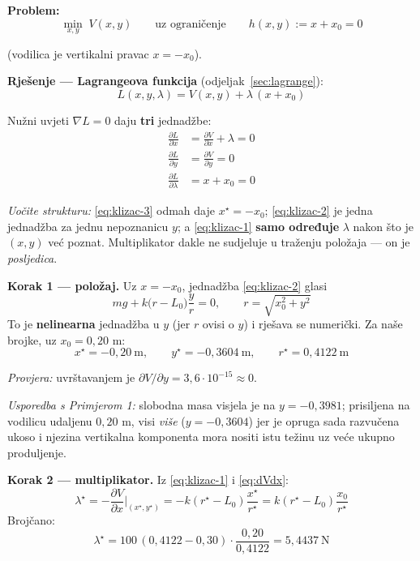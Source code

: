 \textbf{Problem:}
\begin{equation}
\label{eq:klizac}
\min_{x,y}\; V(x,y) \qquad\text{uz ograničenje}\qquad h(x,y) := x + x_0 = 0
\end{equation}

(vodilica je vertikalni pravac $x = -x_0$).

\textbf{Rješenje --- Lagrangeova funkcija} (odjeljak~\ref{sec:lagrange}):
\[
L(x,y,\lambda) = V(x,y) + \lambda\,(x + x_0)
\]

Nužni uvjeti $\nabla L = 0$ daju \textbf{tri} jednadžbe:
\begin{align}
\frac{\partial L}{\partial x} &= \frac{\partial V}{\partial x} + \lambda = 0
  \label{eq:klizac-1}\\
\frac{\partial L}{\partial y} &= \frac{\partial V}{\partial y} = 0
  \label{eq:klizac-2}\\
\frac{\partial L}{\partial \lambda} &= x + x_0 = 0
  \label{eq:klizac-3}
\end{align}

\emph{Uočite strukturu:} \eqref{eq:klizac-3} odmah daje $x^\star = -x_0$;
\eqref{eq:klizac-2} je jedna jednadžba za jednu nepoznanicu $y$; a
\eqref{eq:klizac-1} \textbf{samo određuje} $\lambda$ nakon što je $(x,y)$ već
poznat. Multiplikator dakle ne sudjeluje u traženju položaja --- on je
\emph{posljedica}.

\textbf{Korak 1 --- položaj.} Uz $x = -x_0$, jednadžba \eqref{eq:klizac-2}
glasi
\[
mg + k\big(r - L_0\big)\frac{y}{r} = 0, \qquad r = \sqrt{x_0^2 + y^2}
\]
To je \textbf{nelinearna} jednadžba u $y$ (jer $r$ ovisi o $y$) i rješava se
numerički. Za naše brojke, uz $x_0 = 0{,}20$ m:
\[
x^\star = -0{,}20\ \text{m}, \qquad y^\star = -0{,}3604\ \text{m},
\qquad r^\star = 0{,}4122\ \text{m}
\]

\emph{Provjera:} uvrštavanjem je $\partial V/\partial y = 3{,}6\cdot10^{-15}
\approx 0$. \checkmark

\emph{Usporedba s Primjerom 1:} slobodna masa visjela je na $y = -0{,}3981$;
prisiljena na vodilicu udaljenu $0{,}20$ m, visi \emph{više}
($y = -0{,}3604$) jer je opruga sada razvučena ukoso i njezina vertikalna
komponenta mora nositi istu težinu uz veće ukupno produljenje.

\textbf{Korak 2 --- multiplikator.} Iz \eqref{eq:klizac-1} i \eqref{eq:dVdx}:
\[
\lambda^\star = -\frac{\partial V}{\partial x}\bigg|_{(x^\star,y^\star)}
= -k(r^\star - L_0)\frac{x^\star}{r^\star}
= k(r^\star - L_0)\frac{x_0}{r^\star}
\]
Brojčano:
\[
\lambda^\star = 100\,(0{,}4122 - 0{,}30)\cdot\frac{0{,}20}{0{,}4122}
= 5{,}4437\ \text{N}
\]

